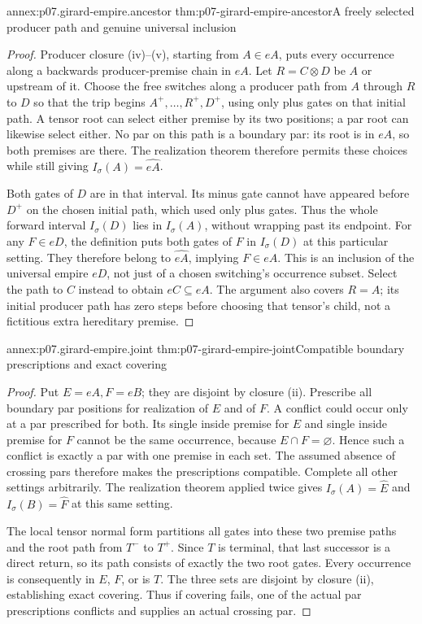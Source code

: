 \begin{annexitem}{annex:p07.girard-empire.ancestor}
 {thm:p07-girard-empire-ancestor}{A freely selected producer path and genuine universal inclusion}
\begin{proof}
Producer closure (iv)--(v), starting from \(A\in eA\), puts every
occurrence along a backwards producer-premise chain in \(eA\).
Let \(R=C\otimes D\) be \(A\) or upstream of it.
Choose the free switches along a producer path from \(A\) through
\(R\) to \(D\) so that the trip begins
\(A^+,\ldots,R^+,D^+\), using only plus gates on that initial path.
A tensor root can select either premise by its two positions; a par
root can likewise select either. No par on this path is a boundary par:
its root is in \(eA\), so both premises are there.
The realization theorem therefore permits these choices while still
giving \(I_\sigma(A)=\widehat{eA}\).

Both gates of \(D\) are in that interval. Its minus gate cannot have
appeared before \(D^+\) on the chosen initial path, which used only
plus gates. Thus the whole forward interval \(I_\sigma(D)\) lies in
\(I_\sigma(A)\), without wrapping past its endpoint.
For any \(F\in eD\), the definition puts both gates of \(F\) in
\(I_\sigma(D)\) at this particular setting. They therefore belong to
\(\widehat{eA}\), implying \(F\in eA\).
This is an inclusion of the universal empire \(eD\), not just of a
chosen switching's occurrence subset. Select the path to \(C\)
instead to obtain \(eC\subseteq eA\).
The argument also covers \(R=A\); its initial producer path has
zero steps before choosing that tensor's child, not a fictitious
extra hereditary premise.
\end{proof}
\end{annexitem}

\begin{annexitem}{annex:p07.girard-empire.joint}
 {thm:p07-girard-empire-joint}{Compatible boundary prescriptions and exact covering}
\begin{proof}
Put \(E=eA,F=eB\); they are disjoint by closure (ii).
Prescribe all boundary par positions for realization of \(E\) and of
\(F\). A conflict could occur only at a par prescribed for both.
Its single inside premise for \(E\) and single inside premise for \(F\)
cannot be the same occurrence, because \(E\cap F=\varnothing\).
Hence such a conflict is exactly a par with one premise in each set.
The assumed absence of crossing pars therefore makes the prescriptions
compatible. Complete all other settings arbitrarily.
The realization theorem applied twice gives
\(I_\sigma(A)=\widehat E\) and \(I_\sigma(B)=\widehat F\)
at this same setting.

The local tensor normal form partitions all gates into these two
premise paths and the root path from \(T^-\) to \(T^+\).
Since \(T\) is terminal, that last successor is a direct return,
so its path consists of exactly the two root gates.
Every occurrence is consequently in \(E\), \(F\), or is \(T\).
The three sets are disjoint by closure (ii), establishing exact covering.
Thus if covering fails, one of the actual par prescriptions conflicts
and supplies an actual crossing par.
\end{proof}
\end{annexitem}

